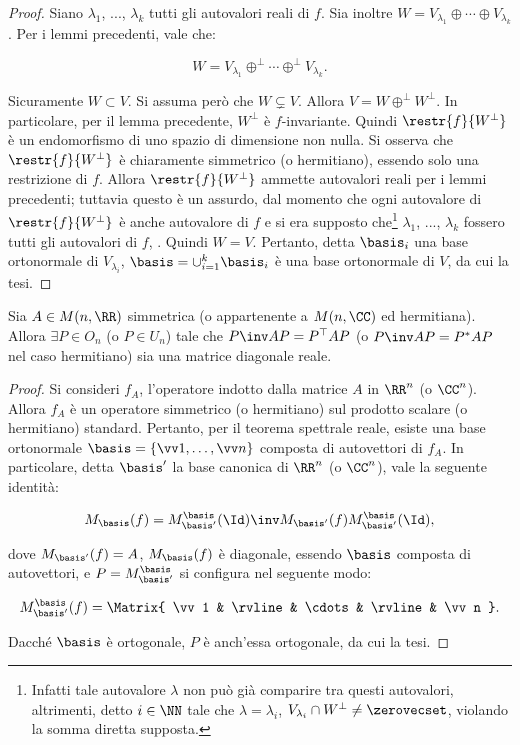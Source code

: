 \documentclass[11pt]{article}
\begin{document}
	\begin{proof}
		Siano $\lambda_1$, ..., $\lambda_k$ tutti gli autovalori reali di $f$. Sia inoltre
		$W = V_{\lambda_1} \oplus \cdots \oplus V_{\lambda_k}$. Per i lemmi precedenti,
		vale che:
		
		\[ W = V_{\lambda_1} \oplus^\perp \cdots \oplus^\perp V_{\lambda_k}. \]
		
		\vskip 0.05in
		
		Sicuramente $W \subset V$. Si assuma però che $W \subsetneq V$. Allora $V = W \oplus^\perp W^\perp$. In particolare, per il lemma
		precedente, $W^\perp$ è $f$-invariante. Quindi $\restr{f}{W^\perp}$ è un endomorfismo
		di uno spazio di dimensione non nulla. Si osserva che $\restr{f}{W^\perp}$ è chiaramente
		simmetrico (o hermitiano), essendo solo una restrizione di $f$. Allora $\restr{f}{W^\perp}$ ammette
		autovalori reali per i lemmi precedenti; tuttavia questo è un assurdo, dal momento che ogni autovalore di $\restr{f}{W^\perp}$ è anche autovalore di $f$ e si era supposto che\footnote{Infatti tale autovalore $\lambda$
		non può già comparire tra questi autovalori, altrimenti, detto $i \in \NN$ tale che $\lambda = \lambda_i$,  $V_{\lambda_i} \cap W^\perp \neq \zerovecset$, violando la somma diretta supposta.} $\lambda_1$, ..., $\lambda_k$ fossero
		tutti gli autovalori di $f$, \Lightning. Quindi $W = V$. Pertanto, detta $\basis_i$ una base ortonormale
		di $V_{\lambda_i}$, $\basis = \cup_{i=1}^k \basis_i$ è una base ortonormale di $V$, da cui la tesi.
	\end{proof}
	
	\begin{corollary} 
		Sia $A \in M(n, \RR)$ simmetrica (o appartenente a $M(n, \CC)$ ed hermitiana). Allora
		$\exists P \in O_n$ (o $P \in U_n$) tale che $P\inv A P = P^\top A P$ (o $P\inv A P = P^* A P$ nel caso hermitiano)
		sia una matrice diagonale reale.
	\end{corollary}
	
	\begin{proof}
		Si consideri $f_A$, l'operatore indotto dalla matrice $A$ in $\RR^n$ (o $\CC^n$). Allora
		$f_A$ è un operatore simmetrico (o hermitiano) sul prodotto scalare (o hermitiano) standard.
		Pertanto, per il teorema spettrale reale, esiste una base ortonormale $\basis = \{ \vv 1, \ldots, \vv n\}$ composta di autovettori
		di $f_A$. In particolare, detta $\basis'$ la base canonica di $\RR^n$ (o $\CC^n$), vale
		la seguente identità:
		
		\[ M_\basis(f) = M_{\basis'}^{\basis}(\Id)\inv M_{\basis'}(f) M_{\basis'}^{\basis}(\Id), \]
		
		dove $M_{\basis'}(f) = A$, $M_\basis(f)$ è diagonale, essendo $\basis$ composta di autovettori, e $P = M_{\basis'}^{\basis}$
		si configura nel seguente modo:
		
		\[ M_{\basis'}^{\basis}(f) = \Matrix{ \vv 1 & \rvline & \cdots & \rvline & \vv n }. \]
		
		Dacché $\basis$ è ortogonale, $P$ è anch'essa ortogonale, da cui la tesi.
	\end{proof}
	
\end{document}
